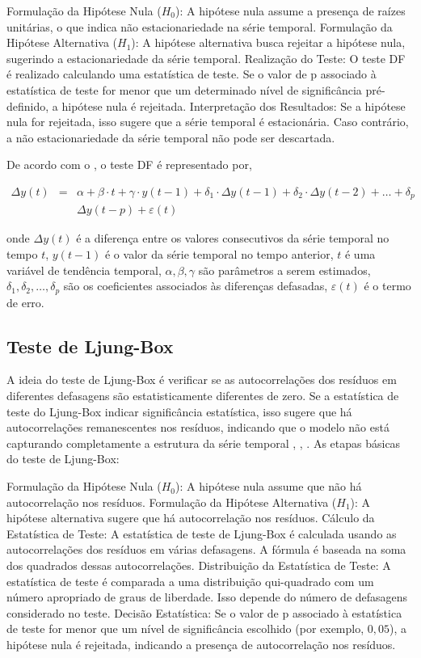 Formulação da Hipótese Nula ($H_0$): A hipótese nula assume a presença de raízes unitárias, o que indica não estacionariedade na série temporal.
Formulação da Hipótese Alternativa ($H_1$): A hipótese alternativa busca rejeitar a hipótese nula, sugerindo a estacionariedade da série temporal.
Realização do Teste: O teste DF é realizado calculando uma estatística de teste. Se o valor de p associado à estatística de teste for menor que um determinado nível de significância pré-definido, a hipótese nula é rejeitada.
Interpretação dos Resultados: Se a hipótese nula for rejeitada, isso sugere que a série temporal é estacionária. Caso contrário, a não estacionariedade da série temporal não pode ser descartada.

De acordo com o , o teste DF é representado por,



\begin{eqnarray}
	 \Delta y(t)&=&\alpha+\beta \cdot t+\gamma \cdot y(t-1)+\delta_1 \cdot \Delta y(t-1)+\delta_2 \cdot \Delta y(t-2)+\ldots+\delta_p \nonumber\\ 
	&&\Delta y(t-p)+\varepsilon(t)
\end{eqnarray}

\noindent onde $\Delta y(t)$ é a diferença entre os valores consecutivos da série temporal no tempo $t$, $y(t-1)$ é o valor da série temporal no tempo anterior, $t$ é uma variável de tendência temporal, $\alpha, \beta, \gamma$ são parâmetros a serem estimados, $\delta_1, \delta_2, \ldots, \delta_p$ são os coeficientes associados às diferenças defasadas, $\varepsilon(t)$ é o termo de erro.
 
 \subsection{Teste de Ljung-Box}
 
A ideia do teste de Ljung-Box é verificar se as autocorrelações dos resíduos em diferentes defasagens são estatisticamente diferentes de zero. Se a estatística de teste do Ljung-Box indicar significância estatística, isso sugere que há autocorrelações remanescentes nos resíduos, indicando que o modelo não está capturando completamente a estrutura da série temporal \cite{box}, \cite{ljung}, \cite{dav}. As etapas básicas do teste de Ljung-Box:

Formulação da Hipótese Nula ($H_0$): A hipótese nula assume que não há autocorrelação nos resíduos.
Formulação da Hipótese Alternativa ($H_1$): A hipótese alternativa sugere que há autocorrelação nos resíduos.
Cálculo da Estatística de Teste: A estatística de teste de Ljung-Box é calculada usando as autocorrelações dos resíduos em várias defasagens. A fórmula é baseada na soma dos quadrados dessas autocorrelações.
Distribuição da Estatística de Teste: A estatística de teste é comparada a uma distribuição qui-quadrado com um número apropriado de graus de liberdade. Isso depende do número de defasagens considerado no teste.
Decisão Estatística: Se o valor de p associado à estatística de teste for menor que um nível de significância escolhido (por exemplo, $0,05$), a hipótese nula é rejeitada, indicando a presença de autocorrelação nos resíduos.
 
